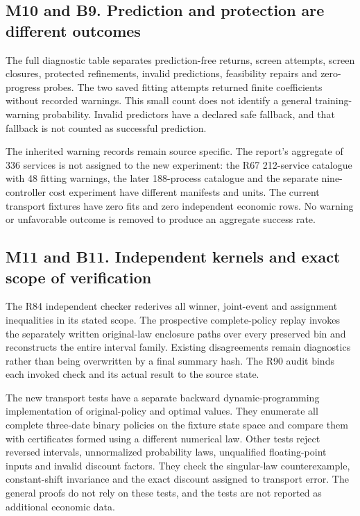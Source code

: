 \hypertarget{m10-and-b9.-prediction-and-protection-are-different-outcomes}{%
\subsection{M10 and B9. Prediction and protection are different
outcomes}\label{m10-and-b9.-prediction-and-protection-are-different-outcomes}}

The full diagnostic table separates prediction-free returns, screen
attempts, screen closures, protected refinements, invalid predictions,
feasibility repairs and zero-progress probes. The two saved fitting
attempts returned finite coefficients without recorded warnings. This
small count does not identify a general training-warning probability.
Invalid predictors have a declared safe fallback, and that fallback is
not counted as successful prediction.

The inherited warning records remain source specific. The report's
aggregate of 336 services is not assigned to the new experiment: the R67
212-service catalogue with 48 fitting warnings, the later 188-process
catalogue and the separate nine-controller cost experiment have
different manifests and units. The current transport fixtures have zero
fits and zero independent economic rows. No warning or unfavorable
outcome is removed to produce an aggregate success rate.

\hypertarget{m11-and-b11.-independent-kernels-and-exact-scope-of-verification}{%
\subsection{M11 and B11. Independent kernels and exact scope of
verification}\label{m11-and-b11.-independent-kernels-and-exact-scope-of-verification}}

The R84 independent checker rederives all winner, joint-event and
assignment inequalities in its stated scope. The prospective
complete-policy replay invokes the separately written original-law
enclosure paths over every preserved bin and reconstructs the entire
interval family. Existing disagreements remain diagnostics rather than
being overwritten by a final summary hash. The R90 audit binds each
invoked check and its actual result to the source state.

The new transport tests have a separate backward dynamic-programming
implementation of original-policy and optimal values. They enumerate all
complete three-date binary policies on the fixture state space and
compare them with certificates formed using a different numerical law.
Other tests reject reversed intervals, unnormalized probability laws,
unqualified floating-point inputs and invalid discount factors. They
check the singular-law counterexample, constant-shift invariance and the
exact discount assigned to transport error. The general proofs do not
rely on these tests, and the tests are not reported as additional
economic data.

